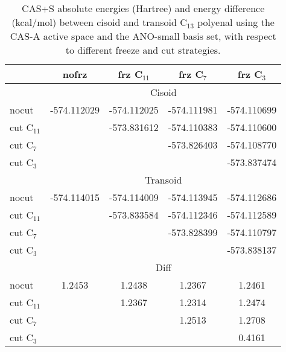\begin{center}
\begin{table}[ht]
\footnotesize
\begin{center}
\begin{tabular}{lcccc}
\hline                                                      
        &    nofrz       &    frz C$_{11}$      &   frz C$_{7}$        &   frz
C$_{3}$      \\
\hline                                                      
			&	\multicolumn{4}{c}{Cisoid} \\
nocut	&  -574.112029   &  -574.112025    &  -574.111981   & -574.110699   \\
cut C$_{11}$	&             	 &  -573.831612    &  -574.110383   & -574.110600   \\
cut C$_{7}$	&             	 &                 &  -573.826403   & -574.108770   \\
cut C$_{3}$	&             	 &             	  &                & -573.837474  	\\
			&	\multicolumn{4}{c}{Transoid} \\
nocut		&	-574.114015  	&	-574.114009  	&	-574.113945  	& -574.112686   \\
cut C$_{11}$&	             	&	-573.833584  	&	-574.112346  	& -574.112589   \\
cut C$_{7}$	&					&					&	-573.828399  	& -574.110797   \\
cut C$_{3}$	&					&					&					& -573.838137  	\\
			&	\multicolumn{4}{c}{Diff} \\
nocut			& 1.2453    &	1.2438    	&	1.2367    	&	1.2461    \\
cut C$_{11}$	&			&  	1.2367    	&	1.2314    	&	1.2474    \\
cut C$_{7}$		&			&				&  	1.2513    	&	1.2708    \\
cut C$_{3}$		&			&				&				&  	0.4161    \\
\hline
\end{tabular}
\end{center}
\caption{\footnotesize CAS+S absolute energies (Hartree) and energy
difference (kcal/mol) between cisoid and transoid C$_{13}$ polyenal using
the CAS-A active space and the ANO-small basis set, with respect to
different freeze and cut strategies.}
\label{tbl:C13-cis-trans-diff}
\end{table}
\end{center}
